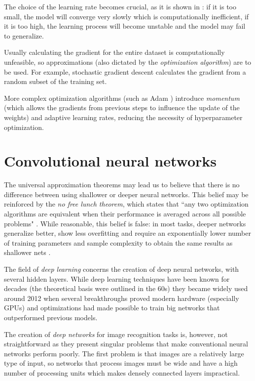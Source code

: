 The choice of the learning rate becomes crucial, as it is shown in : if it is too small, the model will converge very slowly which is computationally inefficient, if it is too high, the learning process will become unstable and the model may fail to generalize. 


Usually calculating the gradient for the entire dataset is computationally unfeasible, so approximations (also dictated by the \textit{optimization algorithm}) are to be used. For example, stochastic gradient descent calculates the gradient from a random subset of the training set.

More complex optimization algorithms (such as Adam \cite{kingma2017adam}) introduce \textit{momentum} (which allows the gradients from previous steps to influence the update of the weights) and adaptive learning rates, reducing the necessity of hyperparameter optimization. 

\section{Convolutional neural networks} \label{sec:cnn}
The universal approximation theorems may lead us to believe that there is no difference between using shallower or deeper neural networks. This belief may be reinforced by the \textit{no free lunch theorem}, which states that “any two optimization algorithms are equivalent when their performance is averaged across all possible problems" \cite{wolper1997freelunch}. While reasonable, this belief is false: in most tasks, deeper networks generalize better, show less overfitting and require an exponentially lower number of training parameters and sample complexity to obtain the same results as shallower nets \cite{hrushikesh2017deep}.

The field of \textit{deep learning} concerns the creation of deep neural networks, with several hidden layers. While deep learning techniques have been known for decades (the theoretical basis were outlined in the 60s) they became widely used around 2012 when several breakthroughs proved modern hardware (especially GPUs) and optimizations had made possible to train big networks that outperformed previous models.

The creation of \textit{deep networks} for image recognition tasks is, however, not straightforward as they present singular problems that make conventional neural networks perform poorly. The first problem is that images are a relatively large type of input, so networks that process images must be wide and have a high number of processing units which makes densely connected layers impractical.

